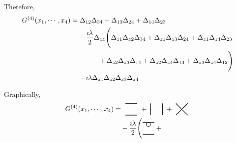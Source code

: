 Therefore,
\begin{align}
  G^{(4)}(x_1,\cdots,x_4) &=
      \Delta_{12}\Delta_{34}
    + \Delta_{13}\Delta_{24}
    + \Delta_{14}\Delta_{23} \notag\\
    & \quad - \frac{\imath\lambda}{2} \Delta_{zz} \Bigg(
    \Delta_{z1}\Delta_{z2}\Delta_{34}
    + \Delta_{z1}\Delta_{z3}\Delta_{24}
    + \Delta_{z1}\Delta_{z4}\Delta_{23} \notag\\
    & \qquad \qquad
    + \Delta_{z2}\Delta_{z3}\Delta_{14}
    + \Delta_{z2}\Delta_{z4}\Delta_{13}
    + \Delta_{z3}\Delta_{z4}\Delta_{12} \Bigg) \notag\\
    & \quad
    - \imath\lambda \Delta_{z1}\Delta_{z2}\Delta_{z3}\Delta_{z4}
\end{align}

Graphically,
\begin{align}
  G^{(4)}(x_1,\cdots,x_4) &=
  \mbox{
    \begin{tikzpicture}[thick,baseline=-\the\dimexpr\fontdimen22\textfont2\relax]%
      \pgfmathsetmacro{\d}{.3}
      \draw (-\d,\d) -- (\d,\d);
      \draw (-\d,-\d) -- (\d,-\d);
    \end{tikzpicture}
  }
  +
  \mbox{
    \begin{tikzpicture}[thick,baseline=-\the\dimexpr\fontdimen22\textfont2\relax]%
      \pgfmathsetmacro{\d}{.3}
      \draw (-\d,\d) -- (-\d,-\d);
      \draw (\d,\d) -- (\d,-\d);
    \end{tikzpicture}
  }
  +
  \mbox{
    \begin{tikzpicture}[thick,baseline=-\the\dimexpr\fontdimen22\textfont2\relax]%
      \pgfmathsetmacro{\d}{.3}
      \draw (-\d,\d) -- (\d,-\d);
      \fill[white] (0,0) circle (1.5pt);
      \draw (-\d,-\d) -- (\d,\d);
    \end{tikzpicture}
  }
  \notag \\
  & \quad
  - \frac{\imath\lambda}{2} \Bigg(
  \begin{tikzpicture}[thick,baseline=-\the\dimexpr\fontdimen22\textfont2\relax]%
    \pgfmathsetmacro{\d}{.3}
    \draw (-\d,\d) -- (\d,\d);
    \draw (0,{\d cm -1mm}) circle (1mm); 
    \draw (-\d,-\d) -- (\d,-\d);
  \end{tikzpicture}
  +
  \begin{tikzpicture}[thick,baseline=-\the\dimexpr\fontdimen22\textfont2\relax]%
    \pgfmathsetmacro{\d}{.3}

\end{tikzpicture}
\end{align}
